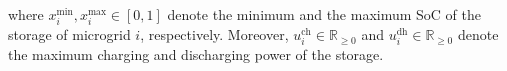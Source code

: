 where $x^{\mathrm{min}}_i,x^{\mathrm{max}}_i  \in [0,1]$  denote the minimum and the maximum SoC of the storage of microgrid $i$, respectively.  Moreover, $u^{\mathrm{ch}}_i \in \mathbb{R}_{\geq 0}$ and $u^{\mathrm{dh}}_i \in \mathbb{R}_{\geq 0}$ denote the maximum charging and discharging power of the storage. 

